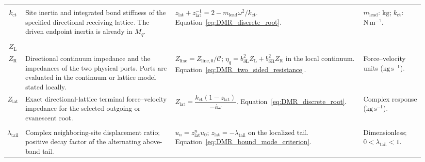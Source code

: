 \begin{longtable}{@{} c p{5.5cm} p{4cm} p{3.5cm} @{}}
\begin{tabular}[c]{@{}c@{}}$m_{\mathrm{lead}}$ \\ $k_{\mathrm{ct}}$\end{tabular} & {\raggedright Site inertia and integrated bond stiffness of the specified directional receiving lattice. The driven endpoint inertia is already in $M_q$.\par} & {\raggedright $z_{\mathrm{lat}}+z_{\mathrm{lat}}^{-1}=2-m_{\mathrm{lead}}\omega^2/k_{\mathrm{ct}}$. \newline Equation~\eqref{eq:DMR_discrete_root}.\par} & {\raggedright $m_{\mathrm{lead}}$: $\mathrm{kg}$; $k_{\mathrm{ct}}$: $\mathrm{N\,m^{-1}}$.\par} \\

\begin{tabular}[c]{@{}c@{}}$Z_{\mathrm{line}}$ \\ $Z_{\mathrm L}$ \\ $Z_{\mathrm R}$\end{tabular} & {\raggedright Directional continuum impedance and the impedances of the two physical ports. Ports are evaluated in the continuum or lattice model stated locally.\par} & {\raggedright $Z_{\mathrm{line}}=Z_{\mathrm{line},0}/\mathcal C$; $\eta_q=b_{\partial\mathrm L}^2Z_{\mathrm L}+b_{\partial\mathrm R}^2Z_{\mathrm R}$ in the local continuum. \newline Equation~\eqref{eq:DMR_two_sided_resistance}.\par} & {\raggedright Force--velocity units ($\mathrm{kg\,s^{-1}}$).\par} \\

$Z_{\mathrm{lat}}$ & {\raggedright Exact directional-lattice terminal force--velocity impedance for the selected outgoing or evanescent root.\par} & {\raggedright $Z_{\mathrm{lat}}=\dfrac{k_{\mathrm{ct}}(1-z_{\mathrm{lat}})}{-i\omega}$. \newline Equation~\eqref{eq:DMR_discrete_root}.\par} & {\raggedright Complex response ($\mathrm{kg\,s^{-1}}$).\par} \\

\begin{tabular}[c]{@{}c@{}}$z_{\mathrm{lat}}$ \\ $\lambda_{\mathrm{tail}}$\end{tabular} & {\raggedright Complex neighboring-site displacement ratio; positive decay factor of the alternating above-band tail.\par} & {\raggedright $u_n=z_{\mathrm{lat}}^nu_0$; $z_{\mathrm{lat}}=-\lambda_{\mathrm{tail}}$ on the localized tail. \newline Equation~\eqref{eq:DMR_bound_mode_criterion}.\par} & {\raggedright Dimensionless; $0<\lambda_{\mathrm{tail}}<1$.\par} \\


\end{longtable}
